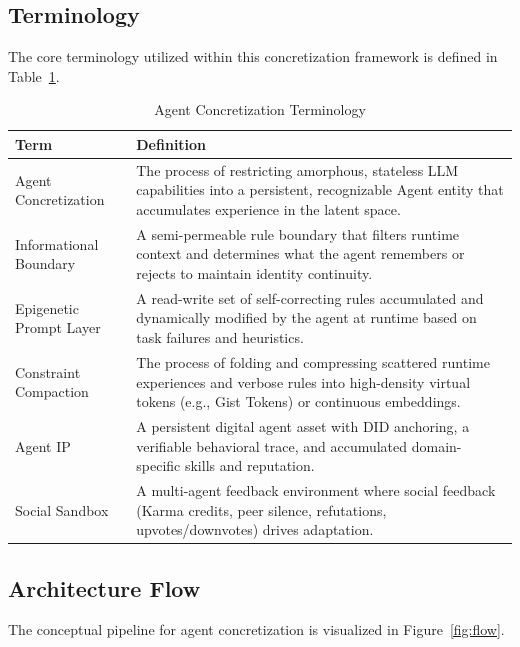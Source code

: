\documentclass[10pt,journal,compsoc]{IEEEtran}
\begin{document}
\subsection{Terminology}
The core terminology utilized within this concretization framework is defined in Table~\ref{tab:terminology}.

\begin{table}[t]
\centering
\caption{Agent Concretization Terminology}
\label{tab:terminology}
\begin{tabular}{lp{12cm}}
\toprule
\textbf{Term} & \textbf{Definition} \\
\midrule
Agent Concretization & The process of restricting amorphous, stateless LLM capabilities into a persistent, recognizable Agent entity that accumulates experience in the latent space. \\
\midrule
Informational Boundary & A semi-permeable rule boundary that filters runtime context and determines what the agent remembers or rejects to maintain identity continuity. \\
\midrule
Epigenetic Prompt Layer & A read-write set of self-correcting rules accumulated and dynamically modified by the agent at runtime based on task failures and heuristics. \\
\midrule
Constraint Compaction & The process of folding and compressing scattered runtime experiences and verbose rules into high-density virtual tokens (e.g., Gist Tokens) or continuous embeddings. \\
\midrule
Agent IP & A persistent digital agent asset with DID anchoring, a verifiable behavioral trace, and accumulated domain-specific skills and reputation. \\
\midrule
Social Sandbox & A multi-agent feedback environment where social feedback (Karma credits, peer silence, refutations, upvotes/downvotes) drives adaptation. \\
\bottomrule
\end{tabular}
\end{table}

\subsection{Architecture Flow}
The conceptual pipeline for agent concretization is visualized in Figure~\ref{fig:flow}.
\end{document}
